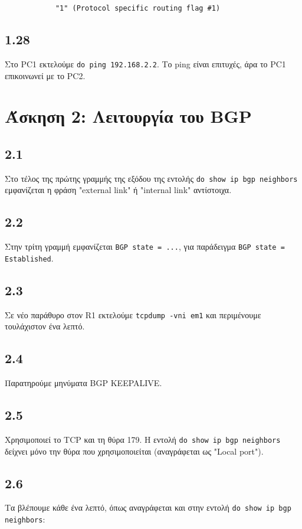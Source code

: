\documentclass[a4paper, 12pt]{article}
\begin{document}
		\begin{verbatim}
			"1" (Protocol specific routing flag #1)
		\end{verbatim} 

	\subsection*{1.28}
		Στο PC1 εκτελούμε \verb|do ping 192.168.2.2|. Το ping είναι επιτυχές, άρα το PC1 επικοινωνεί με το PC2.

\section*{Άσκηση 2: Λειτουργία του BGP}

	\subsection*{2.1}
		Στο τέλος της πρώτης γραμμής της εξόδου της εντολής \verb|do show ip bgp neighbors| εμφανίζεται η φράση "external link" ή "internal link" αντίστοιχα.
		
	\subsection*{2.2}
		Στην τρίτη γραμμή εμφανίζεται \verb|BGP state = ...|, για παράδειγμα \verb|BGP state = Established|.

	\subsection*{2.3}
		Σε νέο παράθυρο στον R1 εκτελούμε \verb|tcpdump -vni em1| και περιμένουμε τουλάχιστον ένα λεπτό.

	\subsection*{2.4}
		Παρατηρούμε μηνύματα BGP KEEPALIVE. 

	\subsection*{2.5}
		Χρησιμοποιεί το TCP και τη θύρα 179. Η εντολή \verb|do show ip bgp neighbors| δείχνει μόνο την θύρα που χρησιμοποιείται (αναγράφεται ως "Local port").

	\subsection*{2.6}
		Τα βλέπουμε κάθε ένα λεπτό, όπως αναγράφεται και στην εντολή \verb|do show ip bgp neighbors|: 
		
\end{document}
